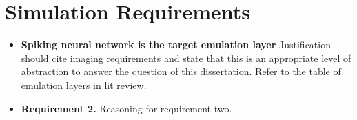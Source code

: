 \section{Simulation Requirements}

\begin{itemize}
    \item \textbf{Spiking neural network is the target emulation layer}
    Justification should cite imaging requirements and state that this is an
    appropriate level of abstraction to answer the question of this
    dissertation. Refer to the table of emulation layers in lit review.
    \item \textbf{Requirement 2.} Reasoning for requirement two.
\end{itemize}